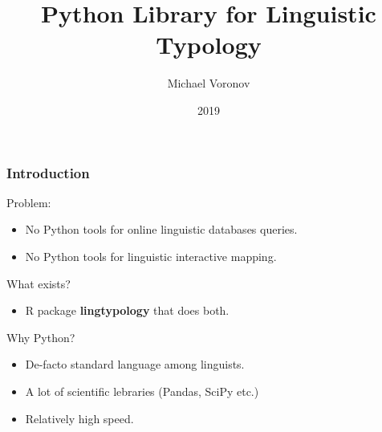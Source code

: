 \documentclass{beamer}
\title{Python Library for Linguistic Typology}
\author{Michael Voronov}
\institute{HSE}
\date{2019}
\begin{document}
 
\frame{\titlepage}
 
\begin{frame}
\frametitle{Introduction}
Problem:
\begin{itemize}
 \item No Python tools for online linguistic databases queries.
 \item No Python tools for linguistic interactive mapping.
\end{itemize}
What exists?
\begin{itemize}
 \item R package \textbf{lingtypology} that does both.
\end{itemize}
Why Python?
\begin{itemize}
 \item De-facto standard language among linguists.
 \item A lot of scientific lebraries (Pandas, SciPy etc.)
 \item Relatively high speed.
\end{itemize}


\end{frame}
 
\end{document}
